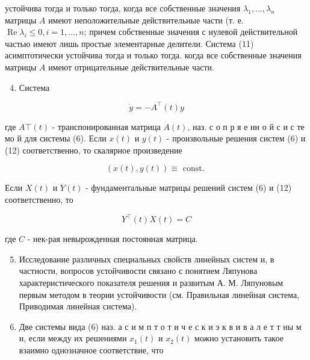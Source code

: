 \documentclass[10pt]{article}
\begin{document}
устойчива тогда и только тогда, когда все собственные значения $\lambda_{1}, \ldots, \lambda_{n}$ матрицы $A$ имеют неположительные действительные части (т. е. $\operatorname{Re} \lambda_{i} \leqslant 0, i=1, \ldots, n$; причем собственные значения с нулевой действительной частью имеют лишь простые элементарные делители. Система (11) асимптотически устойчива тогда и только тогда. когда все собственные значения матрицы $A$ имеют отрицательные действительные части.



\begin{enumerate}

  \setcounter{enumi}{3}

  \item Система

\end{enumerate}



\[

\dot{y}=-A^{\top}(t) y

\]



где $A \top(t)$ - транспонированная матрица $A(t)$, наз. с о п р я е нн о й с и с те мо й для системы (6). Если $x(t)$ и $y(t)$ - произвольные решения систем (6) и (12) соответственно, то скалярное произведение



\[

(x(t), y(t)) \equiv \text { const. }

\]



Если $X(t)$ и $Y(t)$ - фундаментальные матрицы решений систем (6) и (12) соответственно, то



\[

Y^{\top}(t) X(t)=C

\]



где $C$ - нек-рая невырожденная постоянная матрица.



\begin{enumerate}

  \setcounter{enumi}{4}

  \item Исследование различных специальных свойств линейных систем и, в частности, вопросов устойчивости связано с понятием Ляпунова характеристического показателя решения и развитым А. М. Ляпуновым первым методом в теории устойчивости (см. Правильная линейная система, Приводимая линейная система).



  \item Две системы вида (6) наз. а с и м п т о т и ч е с к и э к в и в а л е т т ны м и, если между их решениями $x_{1}(t)$ и $x_{2}(t)$ можно установить такое взаимно однозначное соответствие, что



\end{enumerate}
\end{document}
